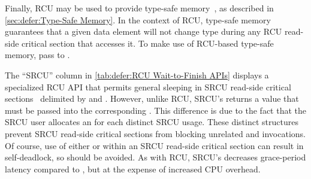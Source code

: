 Finally, RCU may be used to provide
type-safe memory~\cite{Cheriton96a}, as described in
\cref{sec:defer:Type-Safe Memory}.
In the context of RCU, type-safe memory guarantees that a given
data element will not change type during any RCU read-side critical section
that accesses it.
To make use of RCU-based type-safe memory, pass
 to .

The ``SRCU'' column in
\cref{tab:defer:RCU Wait-to-Finish APIs}
displays a specialized RCU API that permits general sleeping in SRCU
read-side critical
sections~\cite{PaulEMcKenney2006c}
delimited by  and .
However, unlike RCU, SRCU's  returns a value that
must be passed into the corresponding .
This difference is due to the fact that the SRCU user allocates an
 for each distinct SRCU usage.
These distinct  structures prevent SRCU read-side critical
sections from blocking unrelated  and
 invocations.
Of course, use of either  or
 within an SRCU read-side critical
section can result in self-deadlock, so should be avoided.
As with RCU, SRCU's  decreases
grace-period latency compared to , but at
the expense of increased CPU overhead.

\QuickQuizEnd

